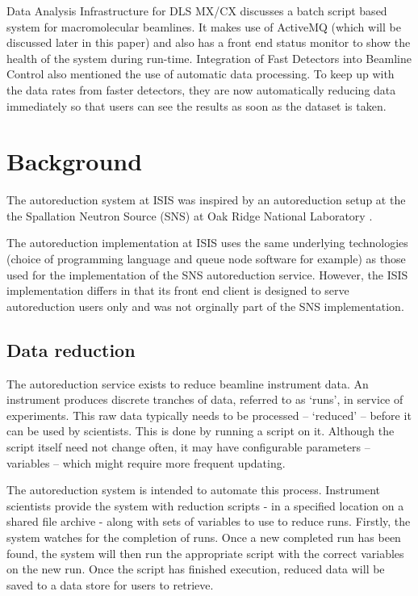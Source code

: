 \documentclass[twocolumn]{article}
\begin{document}
Data Analysis Infrastructure for DLS MX/CX \cite{dls-talk} discusses a batch
script based system for macromolecular beamlines. It makes use of ActiveMQ \cite{activemq}
(which will be discussed later in this paper) and also has a front end status monitor to
show the health of the system during run-time. Integration of Fast Detectors 
into Beamline Control \cite{anl-talk} also mentioned the use of automatic data processing.
To keep up with the data rates from faster detectors, they are now automatically reducing data
immediately so that users can see the results as soon as the dataset is taken.

\section{Background}\label{background}

The autoreduction system at ISIS was inspired by an autoreduction setup at the
the Spallation Neutron Source (SNS) at Oak Ridge National Laboratory \cite{autoreduceSNS}. 

The autoreduction implementation at ISIS uses the same underlying 
technologies (choice of programming language and queue node software
for example) as those used for the implementation of the SNS autoreduction
service. However, the ISIS implementation differs in that its front end 
client is designed to serve autoreduction users only and was not orginally 
part of the SNS implementation.

\subsection{Data reduction}\label{data-reduction}

The autoreduction service exists to reduce beamline instrument data. An
instrument produces discrete tranches of data, referred to as `runs', in
service of experiments. This raw data typically needs to be processed --
`reduced' -- before it can be used by scientists. This is done by running a 
script on it. Although the script itself need not change often, it may have
configurable parameters -- variables -- which might require more frequent
updating.

The autoreduction system is intended to automate this process.
Instrument scientists provide the system with reduction scripts - in a specified
location on a shared file archive - along with sets of variables to use to
reduce runs. Firstly, the system watches  for the completion of runs. Once a new
completed run has been found, the system will then run the appropriate script
with the correct variables on the new run. Once the script has finished execution,
reduced data will be saved to a data store for users to retrieve.
\end{document}
